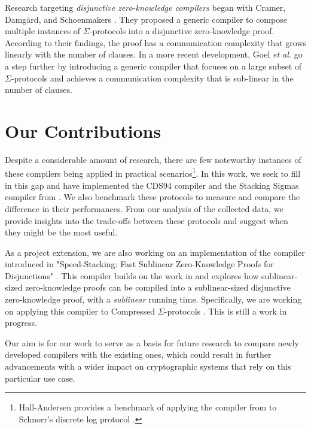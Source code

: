 Research targeting \textit{disjunctive zero-knowledge compilers} began with Cramer, Damg{\aa}rd, and Schoenmakers \cite{CDS94}. 
They proposed a generic compiler to compose multiple instances of $\Sigma$-protocols into a disjunctive zero-knowledge proof. According to their findings, the proof has a communication complexity that grows linearly with the number of clauses.
In a more recent development, Goel {\em et al.} \cite{StackingSigmas} go a step further by introducing a generic compiler that focuses on a large subset of $\Sigma$-protocols and achieves a communication complexity that is sub-linear in the number of clauses.

\section{Our Contributions}

Despite a considerable amount of research, there are few noteworthy instances of these compilers being applied in practical scenarios\footnote{Hall-Andersen \cite{MHAStackSig} provides a benchmark of applying the compiler from
\cite{StackingSigmas} to Schnorr's discrete log protocol \cite{Schnorr}.}. 
In this work, we seek to fill in this gap and have implemented
the CDS94 compiler \cite{CDS94} and the Stacking Sigmas compiler from \cite{StackingSigmas}. 
We also benchmark these protocols to measure and compare the difference in their performances. 
From our analysis of the collected data, we provide insights into the trade-offs between these 
protocols and suggest when they might be the most useful. 

As a project extension, we are also working on an implementation of the compiler 
introduced in "Speed-Stacking: Fast Sublinear Zero-Knowledge Proofs for Disjunctions" 
\cite{SpeedStacking}. This compiler builds on the work in \cite{StackingSigmas} and 
explores how sublinear-sized zero-knowledge proofs can be compiled into a 
sublinear-sized disjunctive zero-knowledge proof, with a \textit{sublinear} 
running time. Specifically, we are working on applying this compiler to Compressed 
$\Sigma$-protocols \cite{attema}. This is still a work in progress.

Our aim is for our work to serve as a basis for future research to compare newly developed compilers with the existing ones, which could result in further advancements with a wider impact on cryptographic systems that rely on this particular use case. 

